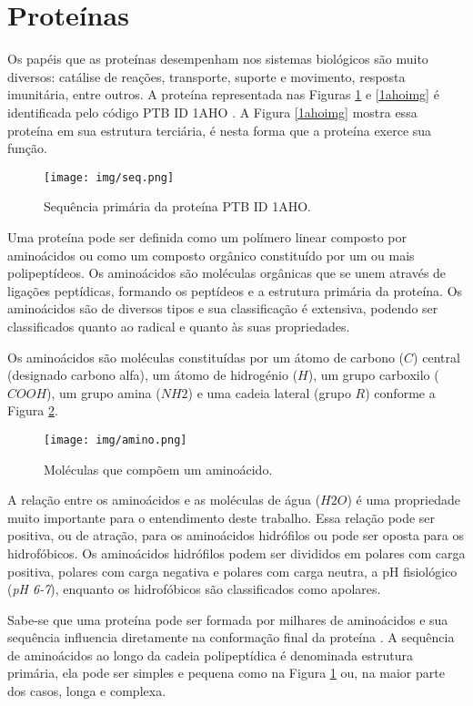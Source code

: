 \documentclass[dm,ppgcomp]{texfurg}
\begin{document}
\section{Proteínas}

Os papéis que as proteínas desempenham nos sistemas biológicos são muito diversos: catálise de reações, transporte, suporte e movimento, resposta imunitária, entre outros. A proteína representada nas Figuras \ref{seq} e \ref{1ahoimg} é identificada pelo código PTB ID 1AHO \cite{berman2000protein}. A Figura \ref{1ahoimg} mostra essa proteína em sua estrutura terciária, é nesta forma que a proteína exerce sua função. 

\begin{figure}[htbp]
  \centering \texttt{[image: img/seq.png]}
\caption{Sequência primária da proteína PTB ID 1AHO.} 
\label{seq}
\end{figure}

Uma proteína pode ser definida como um polímero linear composto por aminoácidos ou como um composto orgânico constituído por um ou mais polipeptídeos. Os aminoácidos são moléculas orgânicas que se unem através de ligações peptídicas, formando os peptídeos e a estrutura primária da proteína. Os aminoácidos são de diversos tipos e sua classificação é extensiva, podendo ser classificados quanto ao radical e quanto às suas propriedades.

Os aminoácidos são moléculas constituídas por um átomo de carbono ($C$) central (designado carbono alfa), um átomo de hidrogénio ($H$), um grupo carboxilo ($COOH$), um grupo amina ($NH2$) e uma cadeia lateral (grupo $R$) conforme a Figura \ref{amino}.

\begin{figure}[htbp]
  \centering \texttt{[image: img/amino.png]}
\caption{Moléculas que compõem um aminoácido.} 
\label{amino}
\end{figure}

A relação entre os aminoácidos e as moléculas de água ($H2O$) é uma propriedade muito importante para o entendimento deste trabalho. Essa relação pode ser positiva, ou de atração, para os aminoácidos hidrófilos ou pode ser oposta para os hidrofóbicos. Os aminoácidos hidrófilos podem ser divididos em polares com carga positiva, polares com carga negativa e polares com carga neutra, a pH fisiológico ({\it pH 6-7}), enquanto os hidrofóbicos são classificados como apolares.

Sabe-se que uma proteína pode ser formada por milhares de aminoácidos e sua sequência influencia diretamente na conformação final da proteína \cite{anfinsen1973principles} . A sequência de aminoácidos ao longo da cadeia polipeptídica é denominada estrutura primária, ela pode ser simples e pequena como na Figura \ref{seq} ou, na maior parte dos casos, longa e complexa.
\end{document}
